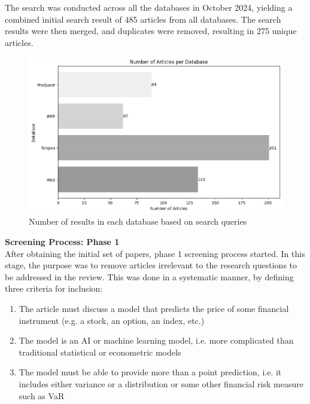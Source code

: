 The search was conducted across all the databases in October 2024, yielding a combined initial search result of 485 articles from all databases. The search results were then merged, and duplicates were removed, resulting in 275 unique articles. 

\begin{figure}[H]
    \centering
    \includegraphics[width=1\linewidth]{Images/search_sample_by_database.png}
    \caption{Number of results in each database based on search queries}
    \label{fig:search_sample_by_database}
\end{figure}



\textbf{Screening Process: Phase 1} \\
After obtaining the initial set of papers, phase 1 screening process started. In this stage, the purpose was to remove articles irrelevant to the research questions to be addressed in the review. This was done in a systematic manner, by defining three criteria for inclusion:

\begin{enumerate}
    \item The article must discuss a model that predicts the price of some financial instrument (e.g. a stock, an option, an index, etc.)

    \item The model is an AI or machine learning model, i.e. more complicated than traditional statistical or econometric models

    \item The model must be able to provide more than a point prediction, i.e. it includes either variance or a distribution or some other financial risk measure such as VaR
\end{enumerate}

